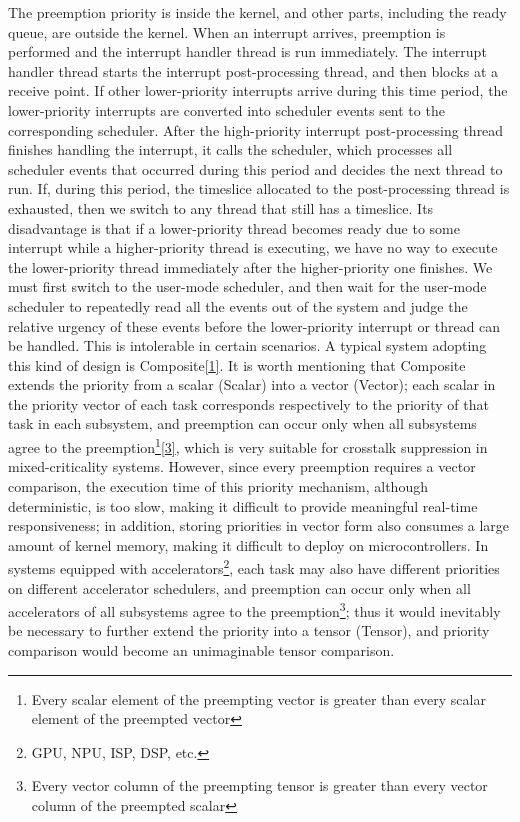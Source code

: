 \begin{enumerate}
  The preemption priority is inside the kernel, and other parts, including the ready queue, are outside the kernel. When an interrupt arrives, preemption is performed and the interrupt handler thread is run immediately. The interrupt handler thread starts the interrupt post-processing thread, and then blocks at a receive point. If other lower-priority interrupts arrive during this time period, the lower-priority interrupts are converted into scheduler events sent to the corresponding scheduler. After the high-priority interrupt post-processing thread finishes handling the interrupt, it calls the scheduler, which processes all scheduler events that occurred during this period and decides the next thread to run. If, during this period, the timeslice allocated to the post-processing thread is exhausted, then we switch to any thread that still has a timeslice. Its disadvantage is that if a lower-priority thread becomes ready due to some interrupt while a higher-priority thread is executing, we have no way to execute the lower-priority thread immediately after the higher-priority one finishes. We must first switch to the user-mode scheduler, and then wait for the user-mode scheduler to repeatedly read all the events out of the system and judge the relative urgency of these events before the lower-priority interrupt or thread can be handled. This is intolerable in certain scenarios. A typical system adopting this kind of design is Composite\hyperref[cite:4-1]{{[}1{]}}. It is worth mentioning that Composite extends the priority from a scalar (Scalar) into a vector (Vector); each scalar in the priority vector of each task corresponds respectively to the priority of that task in each subsystem, and preemption can occur only when all subsystems agree to the preemption\footnote{Every scalar element of the preempting vector is greater than every scalar element of the preempted vector}\hyperref[cite:4-3]{{[}3{]}}, which is very suitable for crosstalk suppression in mixed-criticality systems. However, since every preemption requires a vector comparison, the execution time of this priority mechanism, although deterministic, is too slow, making it difficult to provide meaningful real-time responsiveness; in addition, storing priorities in vector form also consumes a large amount of kernel memory, making it difficult to deploy on microcontrollers. In systems equipped with accelerators\footnote{GPU, NPU, ISP, DSP, etc.}, each task may also have different priorities on different accelerator schedulers, and preemption can occur only when all accelerators of all subsystems agree to the preemption\footnote{Every vector column of the preempting tensor is greater than every vector column of the preempted scalar}; thus it would inevitably be necessary to further extend the priority into a tensor (Tensor), and priority comparison would become an unimaginable tensor comparison.

\end{enumerate}
